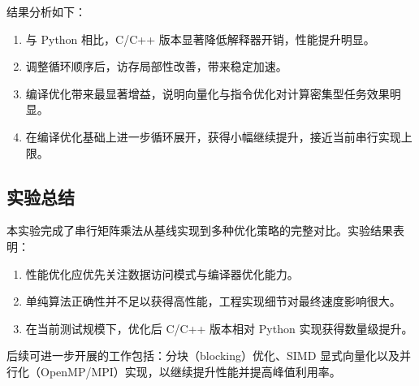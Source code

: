 \documentclass[12pt,a4paper]{ctexart}
\begin{document}
结果分析如下：
\begin{enumerate}
  \item 与 Python 相比，C/C++ 版本显著降低解释器开销，性能提升明显。
  \item 调整循环顺序后，访存局部性改善，带来稳定加速。
  \item 编译优化带来最显著增益，说明向量化与指令优化对计算密集型任务效果明显。
  \item 在编译优化基础上进一步循环展开，获得小幅继续提升，接近当前串行实现上限。
\end{enumerate}

\subsection{实验总结}
本实验完成了串行矩阵乘法从基线实现到多种优化策略的完整对比。实验结果表明：
\begin{enumerate}
  \item 性能优化应优先关注数据访问模式与编译器优化能力。
  \item 单纯算法正确性并不足以获得高性能，工程实现细节对最终速度影响很大。
  \item 在当前测试规模下，优化后 C/C++ 版本相对 Python 实现获得数量级提升。
\end{enumerate}

后续可进一步开展的工作包括：分块（blocking）优化、SIMD 显式向量化以及并行化（OpenMP/MPI）实现，以继续提升性能并提高峰值利用率。
\end{document}
